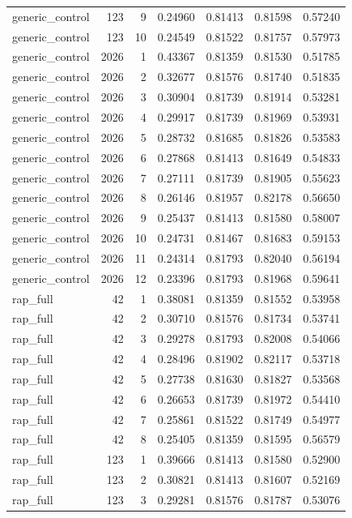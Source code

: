\begin{tabular}{lrrrrrr}
generic_control & 123 & 9 & 0.24960 & 0.81413 & 0.81598 & 0.57240 \\
generic_control & 123 & 10 & 0.24549 & 0.81522 & 0.81757 & 0.57973 \\
generic_control & 2026 & 1 & 0.43367 & 0.81359 & 0.81530 & 0.51785 \\
generic_control & 2026 & 2 & 0.32677 & 0.81576 & 0.81740 & 0.51835 \\
generic_control & 2026 & 3 & 0.30904 & 0.81739 & 0.81914 & 0.53281 \\
generic_control & 2026 & 4 & 0.29917 & 0.81739 & 0.81969 & 0.53931 \\
generic_control & 2026 & 5 & 0.28732 & 0.81685 & 0.81826 & 0.53583 \\
generic_control & 2026 & 6 & 0.27868 & 0.81413 & 0.81649 & 0.54833 \\
generic_control & 2026 & 7 & 0.27111 & 0.81739 & 0.81905 & 0.55623 \\
generic_control & 2026 & 8 & 0.26146 & 0.81957 & 0.82178 & 0.56650 \\
generic_control & 2026 & 9 & 0.25437 & 0.81413 & 0.81580 & 0.58007 \\
generic_control & 2026 & 10 & 0.24731 & 0.81467 & 0.81683 & 0.59153 \\
generic_control & 2026 & 11 & 0.24314 & 0.81793 & 0.82040 & 0.56194 \\
generic_control & 2026 & 12 & 0.23396 & 0.81793 & 0.81968 & 0.59641 \\
rap_full & 42 & 1 & 0.38081 & 0.81359 & 0.81552 & 0.53958 \\
rap_full & 42 & 2 & 0.30710 & 0.81576 & 0.81734 & 0.53741 \\
rap_full & 42 & 3 & 0.29278 & 0.81793 & 0.82008 & 0.54066 \\
rap_full & 42 & 4 & 0.28496 & 0.81902 & 0.82117 & 0.53718 \\
rap_full & 42 & 5 & 0.27738 & 0.81630 & 0.81827 & 0.53568 \\
rap_full & 42 & 6 & 0.26653 & 0.81739 & 0.81972 & 0.54410 \\
rap_full & 42 & 7 & 0.25861 & 0.81522 & 0.81749 & 0.54977 \\
rap_full & 42 & 8 & 0.25405 & 0.81359 & 0.81595 & 0.56579 \\
rap_full & 123 & 1 & 0.39666 & 0.81413 & 0.81580 & 0.52900 \\
rap_full & 123 & 2 & 0.30821 & 0.81413 & 0.81607 & 0.52169 \\
rap_full & 123 & 3 & 0.29281 & 0.81576 & 0.81787 & 0.53076 \\

\end{tabular}
